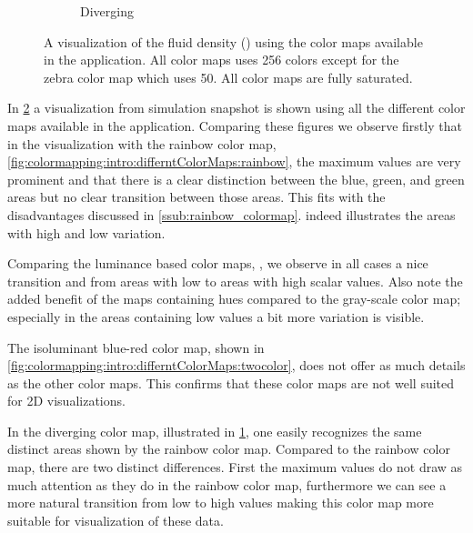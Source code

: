 \begin{figure}[h!]
\begin{subfigure}{0.35\textwidth}
		\caption{
		Diverging
		}
		\label{fig:colormapping:intro:differntColorMaps:diverging}
	\end{subfigure}		
\caption{A visualization of the fluid density (\density) using the color maps available in the application. All color maps uses 256 colors except for the zebra color map which uses 50. All color maps are fully saturated.}
\label{fig:colormapping:colormaps}
\end{figure}


In \cref{fig:colormapping:colormaps} a visualization from simulation snapshot is shown using all the different color maps available in the application. Comparing these figures we observe firstly that in the visualization with the rainbow color map, \cref{fig:colormapping:intro:differntColorMaps:rainbow}, the maximum values are very prominent and that there is a clear distinction between the blue, green, and green areas but no clear transition between those areas. This fits with the disadvantages discussed in \cref{ssub:rainbow_colormap}.  indeed illustrates the areas with high and low variation. 

Comparing the luminance based color maps, , we observe in all cases  a nice transition and from areas with low to areas with high scalar values. Also note the added benefit of the maps containing hues compared to the gray-scale color map; especially in the areas containing low values a bit more variation is visible.


The isoluminant blue-red color map, shown in \cref{fig:colormapping:intro:differntColorMaps:twocolor}, does not offer as much details as the other color maps. This confirms that these color maps are not well suited for 2D visualizations.

In the diverging color map, illustrated in \cref{fig:colormapping:intro:differntColorMaps:diverging}, one easily recognizes the same distinct areas shown by the rainbow color map.  Compared to the rainbow color map, there are two distinct differences. First the maximum values do not draw as much attention as they do in the rainbow color map, furthermore we can see a more natural transition from low to high values making this color map more suitable for visualization of these data.